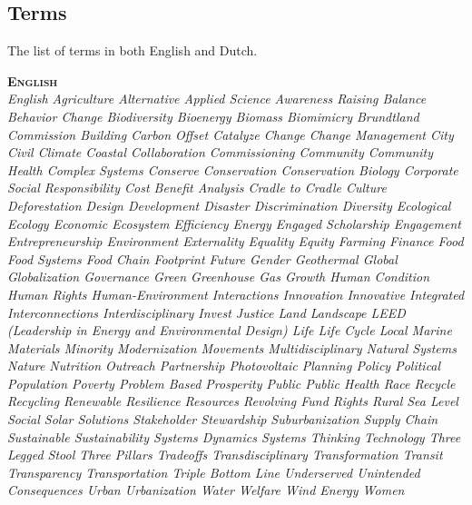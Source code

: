 \documentclass[paper=a4, fontsize=9px]{scrartcl} %
\numberwithin{equation}{section} %
\numberwithin{figure}{section} %
\numberwithin{table}{section} %
\begin{document}
\subsection{Terms}
The list of terms in both English and Dutch. 

\textsc{\textbf{English}} \\\textit{English Agriculture Alternative Applied Science Awareness Raising Balance Behavior Change Biodiversity Bioenergy Biomass Biomimicry Brundtland Commission Building Carbon Offset Catalyze Change Change Management City Civil Climate Coastal Collaboration Commissioning Community Community Health Complex Systems Conserve Conservation Conservation Biology Corporate Social Responsibility Cost Benefit Analysis Cradle to Cradle Culture Deforestation Design Development Disaster Discrimination Diversity Ecological Ecology Economic Ecosystem Efficiency Energy Engaged Scholarship Engagement Entrepreneurship Environment Externality Equality Equity Farming Finance Food Food Systems Food Chain Footprint Future Gender Geothermal Global Globalization Governance Green Greenhouse Gas Growth Human Condition Human Rights Human-Environment Interactions Innovation Innovative Integrated Interconnections Interdisciplinary Invest Justice Land Landscape LEED (Leadership in Energy and Environmental Design) Life Life Cycle Local Marine Materials Minority Modernization Movements Multidisciplinary Natural Systems Nature Nutrition Outreach Partnership Photovoltaic Planning Policy Political Population Poverty Problem Based Prosperity Public Public Health Race Recycle Recycling Renewable Resilience Resources Revolving Fund Rights Rural Sea Level Social Solar Solutions Stakeholder Stewardship Suburbanization Supply Chain Sustainable Sustainability Systems Dynamics Systems Thinking Technology Three Legged Stool Three Pillars Tradeoffs Transdisciplinary Transformation Transit Transparency Transportation Triple Bottom Line Underserved Unintended Consequences Urban Urbanization Water Welfare Wind Energy Women}\\
	
\end{document}
